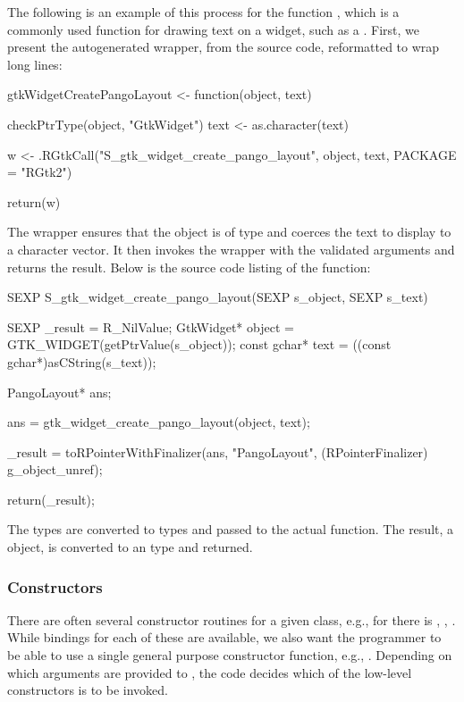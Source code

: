 \documentclass[article,shortnames]{jss}
\begin{document}
The following is an example of this process for the function 
, which is a commonly used function
for drawing text on a widget, such as a . First,
we present the autogenerated  wrapper, from the
 source code, reformatted to wrap long lines:
\begin{Code}
gtkWidgetCreatePangoLayout <-
function(object, text)
{
  checkPtrType(object, "GtkWidget")
  text <- as.character(text)

  w <- .RGtkCall("S_gtk_widget_create_pango_layout", object, 
                 text, PACKAGE = "RGtk2")

  return(w)
}
\end{Code}
The wrapper ensures that the object is of type  and
coerces the text to display to a character vector. It then invokes the
 wrapper with the validated arguments and returns the
result. Below is the source code listing of the
 function:
\begin{Code}
SEXP
S_gtk_widget_create_pango_layout(SEXP s_object, SEXP s_text)
{
  SEXP _result = R_NilValue;
  GtkWidget* object = GTK_WIDGET(getPtrValue(s_object));
  const gchar* text = ((const gchar*)asCString(s_text));

  PangoLayout* ans;

  ans = gtk_widget_create_pango_layout(object, text);

  _result = toRPointerWithFinalizer(ans, "PangoLayout", 
    (RPointerFinalizer) g_object_unref);

  return(_result);
}
\end{Code}
The  types are converted to  types and passed
to the actual  function. The result, a 
object, is converted to an   type and
returned.

\subsubsection{Constructors}

There are often several constructor routines for a given 
class, e.g., for  there is ,
, . While
bindings for each of these are available, we also want the
 programmer to be able to use a single general purpose
constructor function, e.g., . Depending on which
arguments are provided to , the code decides which
of the low-level constructors is to be invoked.
\end{document}
